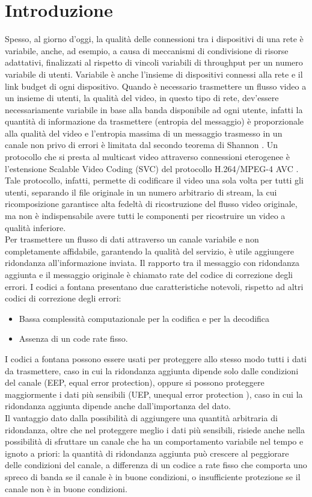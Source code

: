 \documentclass[italian, a4paper, 12pt]{article}
\begin{document}
\section{Introduzione} %
Spesso, al giorno d'oggi, la qualità delle connessioni tra i dispositivi di una rete è variabile, anche, ad esempio, a causa di meccanismi di condivisione di risorse adattativi, finalizzati al rispetto di vincoli variabili di throughput per un numero variabile di utenti. Variabile è anche l'insieme di dispositivi connessi alla rete e il link budget di ogni dispositivo. Quando è necessario trasmettere un flusso video a un insieme di utenti, la qualità del video, in questo tipo di rete, dev'essere necessariamente variabile in base alla banda disponibile ad ogni utente, infatti la quantità di informazione da trasmettere (entropia del messaggio) è proporzionale alla qualità del video e l'entropia massima di un messaggio trasmesso in un canale non privo di errori è limitata dal secondo teorema di Shannon \cite{shannon}. Un protocollo che si presta al multicast video attraverso connessioni eterogenee è l'estensione Scalable Video Coding (SVC) del protocollo H.264/MPEG-4 AVC \cite{svc}. Tale protocollo, infatti, permette di codificare il video una sola volta per tutti gli utenti, separando il file originale in un numero arbitrario di stream, la cui ricomposizione garantisce alta fedeltà di ricostruzione del flusso video originale, ma non è indispensabile avere tutti le componenti per ricostruire un video a qualità inferiore.\\
Per trasmettere un flusso di dati attraverso un canale variabile e non completamente affidabile, garantendo la qualità del servizio, è utile aggiungere ridondanza all'informazione inviata. Il rapporto tra il messaggio con ridondanza aggiunta e il messaggio originale è chiamato rate del codice di correzione degli errori.
I codici a fontana \cite{fcsurvey, rossifc} presentano due caratteristiche notevoli, rispetto ad altri codici di correzione degli errori:
\begin{itemize}
\item Bassa complessità computazionale per la codifica e per la decodifica
\item Assenza di un code rate fisso.
\end{itemize}
I codici a fontana possono essere usati per proteggere allo stesso modo tutti i dati da trasmettere, caso in cui la ridondanza aggiunta dipende solo dalle condizioni del canale (EEP, equal error protection), oppure si possono proteggere maggiormente i dati più sensibili (UEP, unequal error protection \cite{uep}), caso in cui la ridondanza aggiunta dipende anche dall'importanza del dato.\\
Il vantaggio dato dalla possibilità di aggiungere una quantità arbitraria di ridondanza, oltre che nel proteggere meglio i dati più sensibili, risiede anche nella possibilità di sfruttare un canale che ha un comportamento variabile nel tempo e ignoto a priori: la quantità di ridondanza aggiunta può crescere al peggiorare delle condizioni del canale, a differenza di un codice a rate fisso che comporta uno spreco di banda se il canale è in buone condizioni, o insufficiente protezione se il canale non è in buone condizioni.
\end{document}
